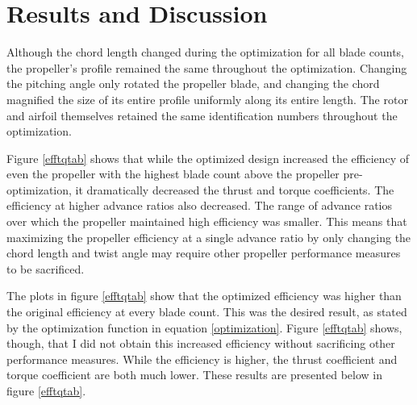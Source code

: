 \documentclass[journal ]{new-aiaa}
\begin{document}
\section{Results and Discussion}

Although the chord length changed during the optimization for all blade counts, the propeller's profile remained the same throughout the optimization. Changing the pitching angle only rotated the propeller blade, and changing the chord magnified the size of its entire profile uniformly along its entire length. The rotor and airfoil themselves retained the same identification numbers throughout the optimization.

Figure \ref{efftqtab} shows that while the optimized design increased the efficiency of even the propeller with the highest blade count above the propeller pre-optimization, it dramatically decreased the thrust and torque coefficients. The efficiency at higher advance ratios also decreased. The range of advance ratios over which the propeller maintained high efficiency was smaller. This means that maximizing the propeller efficiency at a single advance ratio by only changing the chord length and twist angle may require other propeller performance measures to be sacrificed.

The plots in figure \eqref{efftqtab} show that the optimized efficiency was higher than the original efficiency at every blade count. This was the desired result, as stated by the optimization function in equation \ref{optimization}. Figure \eqref{efftqtab} shows, though, that I did not obtain this increased efficiency without sacrificing other performance measures. While the efficiency is higher, the thrust coefficient and torque coefficient are both much lower. These results are presented below in figure \eqref{efftqtab}.
\end{document}
